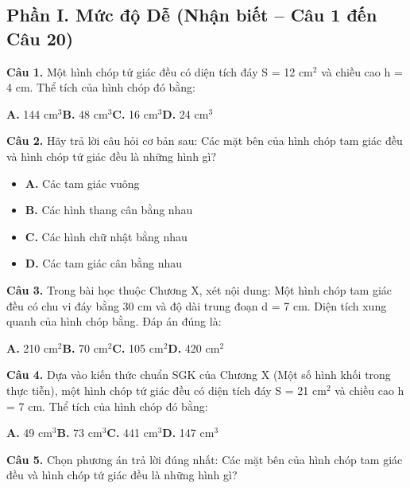\documentclass[11pt,a4paper]{article}
\begin{document}
\subsection*{\color{accent} Phần I. Mức độ Dễ (Nhận biết -- Câu 1 đến Câu 20)}
\textbf{\color{primary} Câu 1.} Một hình chóp tứ giác đều có diện tích đáy S = 12 cm$^2$ và chiều cao h = 4 cm. Thể tích của hình chóp đó bằng:\par
\hspace*{1.5em}\textbf{A.} 144 cm$^3$\quad\quad \textbf{B.} 48 cm$^3$\quad\quad \textbf{C.} 16 cm$^3$\quad\quad \textbf{D.} 24 cm$^3$\par\vspace{2pt}
\textbf{\color{primary} Câu 2.} Hãy trả lời câu hỏi cơ bản sau: Các mặt bên của hình chóp tam giác đều và hình chóp tứ giác đều là những hình gì?\par
\begin{itemize}\setlength{\itemsep}{1pt}\setlength{\parskip}{0pt}
  \item[] \textbf{A.} Các tam giác vuông
  \item[] \textbf{B.} Các hình thang cân bằng nhau
  \item[] \textbf{C.} Các hình chữ nhật bằng nhau
  \item[] \textbf{D.} Các tam giác cân bằng nhau
\end{itemize}\vspace{2pt}
\textbf{\color{primary} Câu 3.} Trong bài học thuộc Chương X, xét nội dung: Một hình chóp tam giác đều có chu vi đáy bằng 30 cm và độ dài trung đoạn d = 7 cm. Diện tích xung quanh của hình chóp bằng. Đáp án đúng là:\par
\hspace*{1.5em}\textbf{A.} 210 cm$^2$\quad\quad \textbf{B.} 70 cm$^2$\quad\quad \textbf{C.} 105 cm$^2$\quad\quad \textbf{D.} 420 cm$^2$\par\vspace{2pt}
\textbf{\color{primary} Câu 4.} Dựa vào kiến thức chuẩn SGK của Chương X (Một số hình khối trong thực tiễn), một hình chóp tứ giác đều có diện tích đáy S = 21 cm$^2$ và chiều cao h = 7 cm. Thể tích của hình chóp đó bằng:\par
\hspace*{1.5em}\textbf{A.} 49 cm$^3$\quad\quad \textbf{B.} 73 cm$^3$\quad\quad \textbf{C.} 441 cm$^3$\quad\quad \textbf{D.} 147 cm$^3$\par\vspace{2pt}
\textbf{\color{primary} Câu 5.} Chọn phương án trả lời đúng nhất: Các mặt bên của hình chóp tam giác đều và hình chóp tứ giác đều là những hình gì?\par
\end{document}
